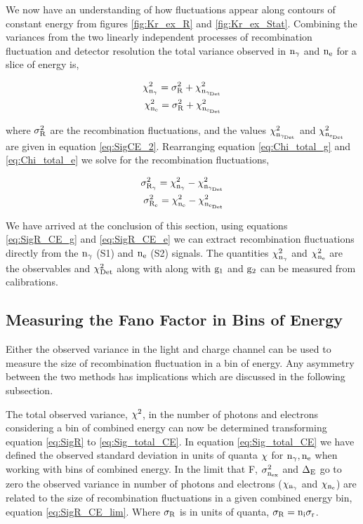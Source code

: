 We now have an understanding of how fluctuations appear along contours of constant energy from figures \ref{fig:Kr_ex_R} and \ref{fig:Kr_ex_Stat}. Combining the variances from the two linearly independent processes of recombination fluctuation and detector resolution the total variance observed in $\rm n_\gamma$ and $\rm n_e$ for a slice of energy is,

\begin{alignat}{2}
\label{eq:Chi_total_g} \rm \chi_{n_{\gamma}}^2 = \sigma_{R}^2 + \chi_{n_{\gamma_{Det}}}^2 \\
\label{eq:Chi_total_e} \rm \chi_{n_{e}}^2 = \sigma_{R}^2 + \chi_{n_{e_{Det}}}^2 \\
\end{alignat}

\noindent where $\rm \sigma_{R}^2$ are the recombination fluctuations, and the values $\rm \chi_{n_{\gamma_{Det}}}^2$ and $\rm \chi_{n_{e_{Det}}}^2$ are given in equation \ref{eq:SigCE_2}. Rearranging equation \ref{eq:Chi_total_g} and \ref{eq:Chi_total_e} we solve for the recombination fluctuations,

\begin{alignat}{2}
\label{eq:SigR_CE_g} \rm \sigma_{R_\gamma}^2 = \chi_{n_\gamma}^2 - \chi_{n_{\gamma_{Det}}}^2  \\
\label{eq:SigR_CE_e} \rm \sigma_{R_e}^2 = \chi_{n_e}^2 - \chi_{n_{e_{Det}}}^2
\end{alignat}

We have arrived at the conclusion of this section, using equations \ref{eq:SigR_CE_g} and \ref{eq:SigR_CE_e} we can extract recombination fluctuations directly from the $\rm n_\gamma$ (S1) and $\rm n_e$ (S2) signals. The quantities $\rm \chi_{n_\gamma}^2$ and  $\rm \chi_{n_e}^2$ are the observables and $\rm \chi_{Det}^2$ along with along with $\rm g_1$ and $\rm g_2$ can be measured from calibrations.

\subsection{Measuring the Fano Factor in Bins of Energy}

Either the observed variance in the light and charge channel can be used to measure the size of recombination fluctuation in a bin of energy. Any asymmetry between the two methods has implications which are discussed in the following subsection.

The total observed variance, $\rm \chi^2$, in the number of photons and electrons considering a bin of combined energy can now be determined transforming equation \ref{eq:SigR} to \ref{eq:Sig_total_CE}.
In equation \ref{eq:Sig_total_CE} we have defined the observed standard deviation in units of quanta $\rm \chi$ for $\rm n_\gamma, n_e$ when working with bins of combined energy. In the limit that F, $\rm \sigma_{n_{ex}}^2$ and $\rm \Delta_E$ go to zero the observed variance in number of photons and electrons ($\rm \chi_{n_\gamma}$ and $\rm \chi_{n_e}$) are related to the size of recombination fluctuations in a given combined energy bin, equation \ref{eq:SigR_CE_lim}. Where $\rm \sigma_R$ is in units of quanta, $\rm \sigma_R = n_i\sigma_r$.

